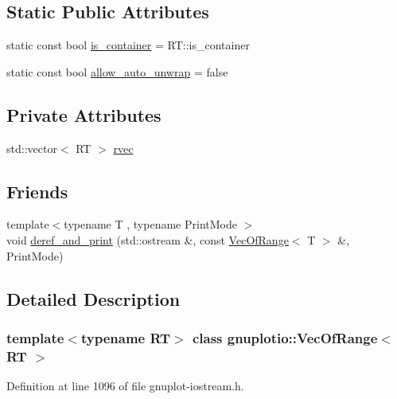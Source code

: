 \subsection*{Static Public Attributes}
\begin{DoxyCompactItemize}
\item 
static const bool \hyperlink{classgnuplotio_1_1_vec_of_range_a8725d4907d46575dddb7152f1f1d1f66}{is\+\_\+container} = R\+T\+::is\+\_\+container
\item 
static const bool \hyperlink{classgnuplotio_1_1_vec_of_range_a19d87e61a7854f9e22d3dd8a94f79500}{allow\+\_\+auto\+\_\+unwrap} = false
\end{DoxyCompactItemize}
\subsection*{Private Attributes}
\begin{DoxyCompactItemize}
\item 
std\+::vector$<$ RT $>$ \hyperlink{classgnuplotio_1_1_vec_of_range_a44d625920b73b31599579fff8e514e7f}{rvec}
\end{DoxyCompactItemize}
\subsection*{Friends}
\begin{DoxyCompactItemize}
\item 
{\footnotesize template$<$typename T , typename Print\+Mode $>$ }\\void \hyperlink{classgnuplotio_1_1_vec_of_range_adafbfb0122b8e499d1af9c246f4ac288}{deref\+\_\+and\+\_\+print} (std\+::ostream \&, const \hyperlink{classgnuplotio_1_1_vec_of_range}{Vec\+Of\+Range}$<$ T $>$ \&, Print\+Mode)
\end{DoxyCompactItemize}


\subsection{Detailed Description}
\subsubsection*{template$<$typename RT$>$\newline
class gnuplotio\+::\+Vec\+Of\+Range$<$ R\+T $>$}



Definition at line 1096 of file gnuplot-\/iostream.\+h.



